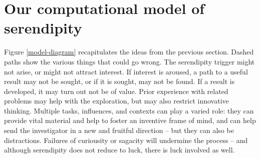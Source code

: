 \section{Our computational model of serendipity} \label{sec:our-model}

Figure \ref{model-diagram} recapitulates the ideas from the previous
section.  Dashed paths show the various things that could go wrong.
The serendipity trigger might not arise, or might not attract
interest.  If interest is aroused, a path to a useful result may not
be sought, or if it is sought, may not be found.  If a result is
developed, it may turn out not be of value.  Prior experience with
related problems may help with the exploration, but may also restrict
innovative thinking.  Multiple tasks, influences, and contexts can
play a varied role: they can provide vital material and help to foster
an inventive frame of mind, and can help send the investigator in a
new and fruitful direction -- but they can also be distractions.
Failures of curiousity or sagacity will undermine the process -- and
although serendipity does not reduce to luck, there is luck
involved as well.

